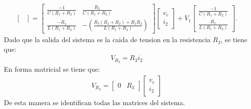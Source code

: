 \documentclass[
  11pt,
  letterpaper,
   addpoints,
   answers
  ]{exam}
\begin{document}
\begin{questions}
\begin{solution}
\begin{align}
\begin{bmatrix}
        \end{bmatrix} =
        \begin{bmatrix}
        \frac{-1}{C(R_{1}+R_{2})} & \frac{R_{2}}{C(R_{1}+R_{2})} \\
        \frac{-R_{2}}{L(R_{1}+R_{2})} &  
        -\left(\frac{R_{3}(R_{1}+R_{2}) + R_{1}R_{2}}{L(R_{1}+R_{2})} \right)
        \end{bmatrix}
        \begin{bmatrix}
        v_{c} \\
        i_{2}
        \end{bmatrix}
        + V_1
        \begin{bmatrix}
        \frac{-1}{C(R_{1}+R_{2})} \\
        \frac{R_{1}}{L(R_{1}+R_{2})}
        \end{bmatrix}.
    \end{align}        
    Dado que la salida del sistema es la caida de tension en la resistencia $R_{3}$, se tiene que:
    \begin{align}
        V_{R_{3}} = R_{3}i_{2}
    \end{align}
    En forma matricial se tiene que:
    \begin{align}
        V_{R_{3}} = \begin{bmatrix}
            0 & R_{3}
        \end{bmatrix} \begin{bmatrix}
            v_{c} \\
            i_{2}
        \end{bmatrix}
    \end{align}
    De esta manera se identifican todas las matrices del sistema.

\end{solution}
\end{questions}
\end{document}
